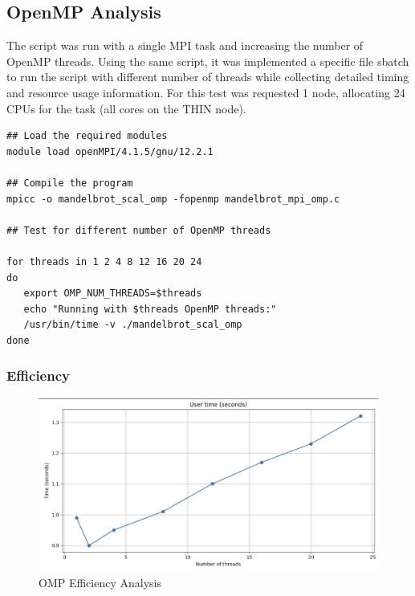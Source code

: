 \documentclass[
]{article}
\begin{document}
\subsection{OpenMP Analysis}\label{openmp-analysis}

The script was run with a single MPI task and increasing the number of
OpenMP threads. Using the same script, it was implemented a specific
file sbatch to run the script with different number of threads while
collecting detailed timing and resource usage information. For this test
was requested 1 node, allocating 24 CPUs for the task (all cores on the
THIN node).

\begin{verbatim}
## Load the required modules
module load openMPI/4.1.5/gnu/12.2.1

## Compile the program
mpicc -o mandelbrot_scal_omp -fopenmp mandelbrot_mpi_omp.c

## Test for different number of OpenMP threads

for threads in 1 2 4 8 12 16 20 24
do
   export OMP_NUM_THREADS=$threads
   echo "Running with $threads OpenMP threads:"
   /usr/bin/time -v ./mandelbrot_scal_omp
done
\end{verbatim}

\subsubsection{Efficiency}\label{efficiency}

\begin{figure}
\includegraphics[width=1\linewidth]{figures/eff_omp_1.png}
\caption{OMP Efficiency Analysis}
\label{}
\end{figure}
\end{document}
